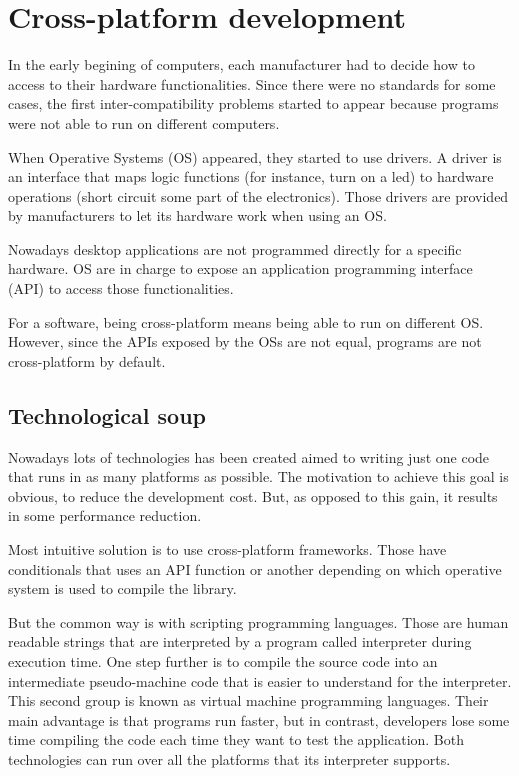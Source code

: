\chapter{Cross-platform development}

In the early begining of computers, each manufacturer had to decide how to access to
their hardware functionalities. Since there were no standards for some cases,
the first inter-compatibility problems started to appear because programs were
not able to run on different computers.

When Operative Systems (OS) appeared, they started to use drivers. A driver is
an interface that maps logic functions (for instance, turn on a led) to hardware
operations (short circuit some part of the electronics). Those drivers are
provided by manufacturers to let its hardware work when using an OS.

Nowadays desktop applications are not programmed directly for a specific 
hardware. OS are in charge to expose an application programming interface (API)
to access those functionalities.

For a software, being cross-platform means being able to run on different OS. However, since the APIs
exposed by the OSs are not equal, programs are not cross-platform by default.

\section{Technological soup}

Nowadays lots of technologies has been created aimed to writing just one code
that runs in as many platforms as possible. The motivation to achieve this goal
is obvious, to reduce the development cost. But, as opposed to this gain, it
results in some performance reduction.

Most intuitive solution is to use cross-platform frameworks. Those have
conditionals that uses an API function or another depending on which operative
system is used to compile the library.

But the common way is with scripting programming languages. Those are human
readable strings that are interpreted by a program called interpreter during
execution time. One step further is to compile the source code into an
intermediate pseudo-machine code that is easier to understand for the
interpreter. This second group is known as virtual machine programming
languages. Their main advantage is that programs run faster, but in contrast,
developers lose some time compiling the code each time they want to test the
application. Both technologies can run over all the platforms that its
interpreter supports.

